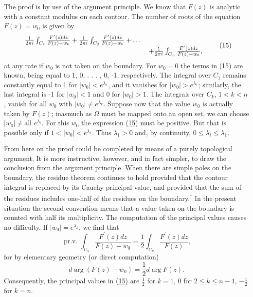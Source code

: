 The proof is by use of the argument principle. We know that $F(z)$ is analytic with a constant modulus on each contour. The number of roots of the equation $F(z) = w_{0}$ is given by
\begin{equation*}
\begin{array}{r l} \frac {1}{2 \pi i} \int_ {C _ {1}} \frac {F ^ {\prime} (z) d z}{F (z) - w _ {0}} + \frac {1}{2 \pi i} \int_ {C _ {2}} \frac {F ^ {\prime} (z) d z}{F (z) - w _ {0}} + \dots & \\ & + \frac {1}{2 \pi i} \int_ {C _ {n}} \frac {F ^ {\prime} (z) d z}{F (z) - w _ {0}}, \end{array}\tag{15}\label{eq:6.15}
\end{equation*}
at any rate if $w_{0}$ is not taken on the boundary. For $w_{0}=0$ the terms in \hyperref[eq:6.15]{(15)} are known, being equal to 1, 0, . . . , 0, -1, respectively. The
integral over $C_1$ remains constantly equal to 1 for $|w_0| < e^{\lambda_1}$, and it vanishes for $|w_0| > e^{\lambda_1}$; similarly, the last integral is -1 for $|w_0| < 1$ and 0 for $|w_0| > 1$. The integrals over $C_k$, $1 < k < n$, vanish for all $w_0$ with $|w_0| \neq e^{\lambda_k}$. Suppose now that the value $w_0$ is actually taken by $F(z)$; inasmuch as $\Omega$ must be mapped onto an open set, we can choose $|w_0| \neq \text{all } e^{\lambda_i}$. For this $w_0$ the expression \hyperref[eq:6.15]{(15)} must be positive. But that is possible only if $1 < |w_0| < e^{\lambda_1}$. Thus $\lambda_1 > 0$ and, by continuity, $0 \leq \lambda_i \leq \lambda_1$.

From here on the proof could be completed by means of a purely topological argument. It is more instructive, however, and in fact simpler, to draw the conclusion from the argument principle. When there are simple poles on the boundary, the residue theorem continues to hold provided that the contour integral is replaced by its Cauchy principal value, and provided that the sum of the residues includes one-half of the residues on the boundary.\hyperlink{fn:272:dagger}{\textsuperscript{\ensuremath{\dagger}}} In the present situation the second convention means that a value taken on the boundary is counted with half its multiplicity. The computation of the principal values causes no difficulty. If $|w_0| = e^{\lambda_k}$, we find that
\begin{equation*}
\text { pr.v. } \int_ {C _ {k}} \frac {F ^ {\prime} (z) d z}{F (z) - w _ {0}} = \frac {1}{2} \int_ {C _ {k}} \frac {F ^ {\prime} (z) d z}{F (z)},
\end{equation*}
for by elementary geometry (or direct computation)
\begin{equation*}
d \arg (F (z) - w _ {0}) = \frac {1}{2} d \arg F (z).
\end{equation*}
Consequently, the principal values in \hyperref[eq:6.15]{(15)} are $\frac{1}{2}$ for $k = 1$, 0 for $2 \leq k \leq n - 1$, $-\frac{1}{2}$ for $k = n$.

